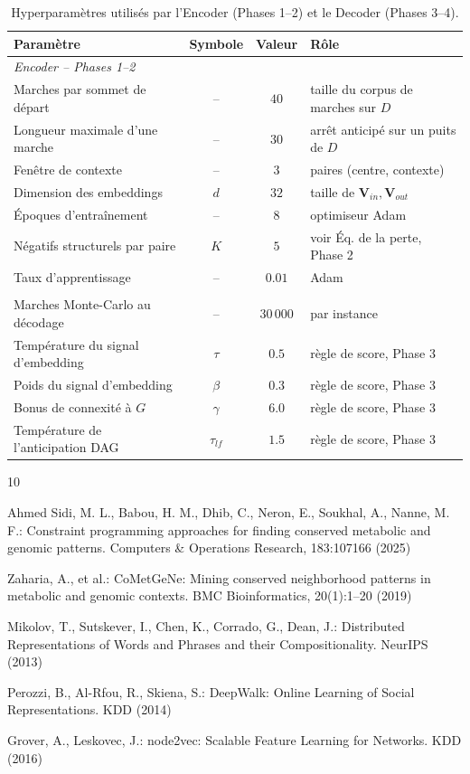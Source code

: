 \documentclass{llncs}
\begin{document}
\begin{table}[htbp]
\centering
\caption{Hyperparamètres utilisés par l'Encoder (Phases 1--2) et le Decoder (Phases 3--4).}
\label{tab:hyperparams}
\begin{tabularx}{\textwidth}{Xccp{}}
\toprule
\textbf{Paramètre} & \textbf{Symbole} & \textbf{Valeur} & \textbf{Rôle} \\
\midrule
\multicolumn{4}{l}{\emph{Encoder -- Phases 1--2}} \\
Marches par sommet de départ & -- & $40$ & taille du corpus de marches sur $D$ \\
Longueur maximale d'une marche & -- & $30$ & arrêt anticipé sur un puits de $D$ \\
Fenêtre de contexte & -- & $3$ & paires (centre, contexte) \\
Dimension des embeddings & $d$ & $32$ & taille de $\mathbf{V}_{in}, \mathbf{V}_{out}$ \\
Époques d'entraînement & -- & $8$ & optimiseur Adam \\
Négatifs structurels par paire & $K$ & $5$ & voir Éq. de la perte, Phase 2 \\
Taux d'apprentissage & -- & $0.01$ & Adam \\
\addlinespace
\multicolumn{4}{l}{\emph{Decoder -- Phases 3--4}} \\
Marches Monte-Carlo au décodage & -- & $30\,000$ & par instance \\
Température du signal d'embedding & $\tau$ & $0.5$ & règle de score, Phase 3 \\
Poids du signal d'embedding & $\beta$ & $0.3$ & règle de score, Phase 3 \\
Bonus de connexité à $G$ & $\gamma$ & $6.0$ & règle de score, Phase 3 \\
Température de l'anticipation DAG & $\tau_{lf}$ & $1.5$ & règle de score, Phase 3 \\
\bottomrule
\end{tabularx}
\end{table}

\begin{thebibliography}{10}

Ahmed Sidi, M. L., Babou, H. M., Dhib, C., Neron, E., Soukhal, A., Nanne, M. F.:
Constraint programming approaches for finding conserved metabolic and genomic patterns.
Computers \& Operations Research, 183:107166 (2025)

Zaharia, A., et al.:
CoMetGeNe: Mining conserved neighborhood patterns in metabolic and genomic contexts.
BMC Bioinformatics, 20(1):1--20 (2019)

Mikolov, T., Sutskever, I., Chen, K., Corrado, G., Dean, J.:
Distributed Representations of Words and Phrases and their Compositionality.
NeurIPS (2013)

Perozzi, B., Al-Rfou, R., Skiena, S.:
DeepWalk: Online Learning of Social Representations.
KDD (2014)

Grover, A., Leskovec, J.:
node2vec: Scalable Feature Learning for Networks.
KDD (2016)

\end{thebibliography}
\end{document}
